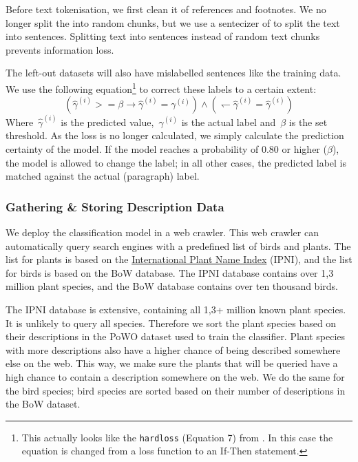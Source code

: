 \documentclass[a4paper, 12pt, oneside]{book} %
\begin{document}
Before text tokenisation, we first clean it of references and footnotes.
We no longer split the into random chunks, but we use a sentecizer of \textcite{honnibal_spacy_2020} to split the text into sentences.
Splitting text into sentences instead of random text chunks prevents information loss.

The left-out datasets will also have mislabelled sentences like the training data.
We use the following equation\footnote{This actually looks like the \texttt{hardloss} (Equation 7) from \textcite{reed_training_2015}. In this case the equation is changed from a loss function to an If-Then statement.} to correct these labels to a certain extent:
\begin{equation} \label{eq:softloss_ifthen}
(\hat{\gamma}^{(i)} >= \beta \rightarrow \hat{\gamma}^{(i)} = \gamma^{(i)}) \wedge ( \leftharpoondown \hat{\gamma}^{(i)} = \hat{\gamma}^{(i)})
\end{equation}
Where~$\hat{\gamma}^{(i)}$ is the predicted value,~$\gamma^{(i)}$ is the actual label and~$\beta$ is the set threshold. 
As the loss is no longer calculated, we simply calculate the prediction certainty of the model.
If the model reaches a probability of 0.80 or higher (\(\beta\)), the model is allowed to change the label; in all other cases, the predicted label is matched against the actual (paragraph) label.


\subsubsection{Gathering \& Storing Description Data}
We deploy the classification model in a web crawler.
This web crawler can automatically query search engines with a predefined list of birds and plants.
The list for plants is based on the \href{https://www.ipni.org/}{International Plant Name Index} (IPNI), and the list for birds is based on the BoW database. %
The IPNI database contains over 1,3 million plant species, and the BoW database contains over ten thousand birds.

The IPNI database is extensive, containing all 1,3+ million known plant species.
It is unlikely to query all species. 
Therefore we sort the plant species based on their descriptions in the PoWO dataset used to train the classifier.
Plant species with more descriptions also have a higher chance of being described somewhere else on the web.
This way, we make sure the plants that will be queried have a high chance to contain a description somewhere on the web.
We do the same for the bird species; bird species are sorted based on their number of descriptions in the BoW dataset.
\end{document}
